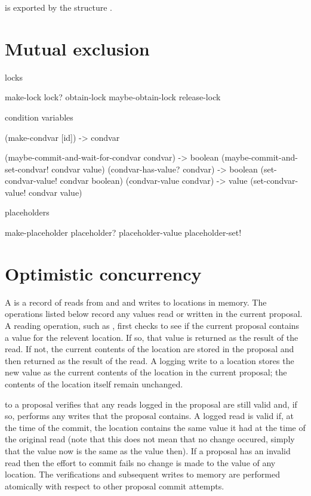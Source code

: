 is exported by the structure .

\section{Mutual exclusion}

locks

 make-lock
 lock?
 obtain-lock
 maybe-obtain-lock
 release-lock

\begin{protos}
\end{protos}


condition variables

 (make-condvar [id]) -> condvar


 (maybe-commit-and-wait-for-condvar condvar) -> boolean
 (maybe-commit-and-set-condvar! condvar value)
 (condvar-has-value? condvar) -> boolean
 (set-condvar-value! condvar boolean)
 (condvar-value condvar) -> value
 (set-condvar-value! condvar value)

placeholders

 make-placeholder
 placeholder?
 placeholder-value
 placeholder-set!

\section{Optimistic concurrency}


A  is a record of reads from and and writes to locations in
 memory.
The  operations listed below record any values read or
 written in the current proposal.
A reading operation, such as , first checks to
 see if the current proposal contains a value for the relevent location.
If so, that value is returned as the result of the read.
If not, the current contents of the location are stored in the proposal and
 then returned as the result of the read.
A logging write to a location stores the new value as the current contents of
 the location in the current proposal; the contents of the location itself
 remain unchanged.

 to a proposal verifies that any reads logged in
 the proposal are still valid and, if so, performs any writes that
 the proposal contains.
A logged read is valid if, at the time of the commit, the location contains
 the same value it had at the time of the original read (note that this does
 not mean that no change occured, simply that the value now is the same as
 the value then).
If a proposal has an invalid read then the effort to commit fails no change
 is made to the value of any location.
The verifications and subsequent writes to memory are performed atomically
 with respect to other proposal commit attempts.

